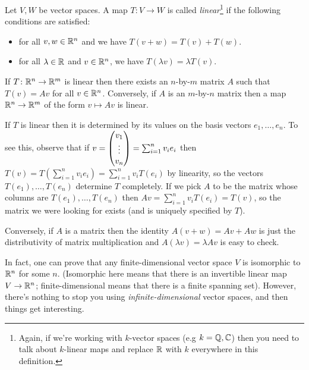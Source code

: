 \documentclass{article}
\begin{document}
\begin{Definition}
Let \(V,W\) be vector spaces. A map \(T\colon V\to W\) is called
{\em linear}\footnote{Again, if we're working with \(k\)-vector
spaces (e.g \(k=\mathbb{Q},\mathbb{C}\)) then you need to talk about \(k\)-linear
maps and replace \(\mathbb{R}\) with \(k\) everywhere in this definition.}
if the following conditions are satisfied:
\begin{itemize}
\item for all \(v,w\in\mathbb{R}^n\) and we have \(T(v+w)=T(v)+T(w)\).
\item for all \(\lambda\in\mathbb{R}\) and \(v\in\mathbb{R}^n\), we have \(T(\lambda
v)=\lambda T(v)\).


\end{itemize}
\end{Definition}
\begin{Theorem}
If \(T\colon\mathbb{R}^n\to\mathbb{R}^m\) is linear then there exists an
\(n\)-by-\(m\) matrix \(A\) such that \(T(v)=Av\) for all
\(v\in\mathbb{R}^n\). Conversely, if \(A\) is an \(m\)-by-\(n\) matrix then
a map \(\mathbb{R}^n\to\mathbb{R}^m\) of the form \(v\mapsto Av\) is linear.
\end{Theorem}
\begin{Proof}
If \(T\) is linear then it is determined by its values on the basis
vectors \(e_1,\ldots,e_n\). To see this, observe that if \(v=\begin{pmatrix}
v_1\\ \vdots\\ v_n\end{pmatrix}=\sum_{i=1}^nv_ie_i\) then
\(T(v)=T(\sum_{i=1}^nv_ie_i)=\sum_{i=1}^nv_iT(e_i)\) by linearity,
so the vectors \(T(e_1),\ldots,T(e_n)\) determine \(T\)
completely. If we pick \(A\) to be the matrix whose columns are
\(T(e_1),\ldots,T(e_n)\) then \(Av=\sum_{i=1}^nv_iT(e_i)=T(v)\), so
the matrix we were looking for exists (and is uniquely specified by
\(T\)).


Conversely, if \(A\) is a matrix then the identity \(A(v+w)=Av+Aw\)
is just the distributivity of matrix multiplication and \(A(\lambda
v)=\lambda Av\) is easy to check. \qedhere


\end{Proof}
In fact, one can prove that any finite-dimensional vector space \(V\) is
isomorphic to \(\mathbb{R}^n\) for some \(n\). (Isomorphic here means that
there is an invertible linear map \(V\to\mathbb{R}^n\); finite-dimensional
means that there is a finite spanning set). However, there's nothing
to stop you using {\em infinite-dimensional} vector spaces, and then
things get interesting.
\end{document}
